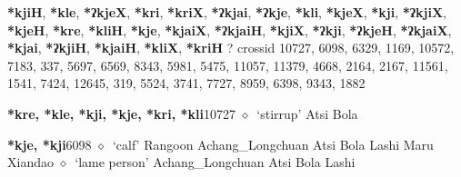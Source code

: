 \item
\textbf{*kjiH}, \textbf{*kle}, \textbf{*ʔkjeX}, \textbf{*kri}, \textbf{*kriX}, \textbf{*ʔkjai}, \textbf{*ʔkje}, \textbf{*kli}, \textbf{*kjeX}, \textbf{*kji}, \textbf{*ʔkjiX}, \textbf{*kjeH}, \textbf{*kre}, \textbf{*kliH}, \textbf{*kje}, \textbf{*kjaiX}, \textbf{*ʔkjaiH}, \textbf{*kjiX}, \textbf{*ʔkji}, \textbf{*ʔkjeH}, \textbf{*ʔkjaiX}, \textbf{*kjai}, \textbf{*ʔkjiH}, \textbf{*kjaiH}, \textbf{*kliX}, \textbf{*kriH}
?
  {\tiny crossid 10727, 6098, 6329, 1169, 10572, 7183, 337, 5697, 6569, 8343, 5981, 5475, 11057, 11379, 4668, 2164, 2167, 11561, 1541, 7424, 12645, 319, 5524, 3741, 7727, 8959, 6398, 9343, 1882}
  \begin{list}{}{\leftmargin=1.5em \itemindent=-1.5em}
  \item {\footnotesize \textbf{*kre, *kle, *kji, *kje, *kri, *kli}}{\tiny 10727}
         $\diamond$~`stirrup'
         Atsi 
\hspace{1ex}
         Bola 
  \item {\footnotesize \textbf{*kje, *kji}}{\tiny 6098}
\hspace{1ex}
         $\diamond$~`calf'
         Rangoon 
\hspace{1ex}
         Achang\_Longchuan 
\hspace{1ex}
         Atsi 
\hspace{1ex}
         Bola 
\hspace{1ex}
         Lashi 
\hspace{1ex}
         Maru 
\hspace{1ex}
         Xiandao 
\hspace{1ex}
         $\diamond$~`lame person'
         Achang\_Longchuan 
\hspace{1ex}
         Atsi 
\hspace{1ex}
         Bola 
\hspace{1ex}
         Lashi 
\hspace{1ex}

\end{list}
